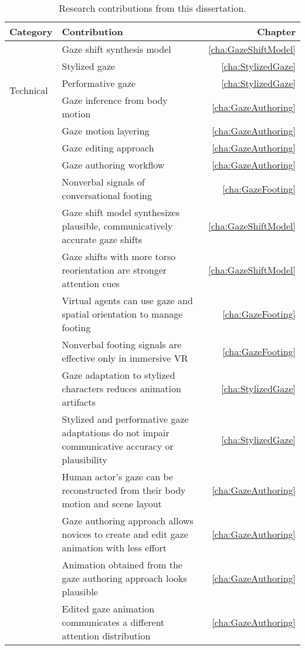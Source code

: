 \begin{table}
\small
\centering
\def\arraystretch{1.5}
\begin{tabularx}{\textwidth}{lp{10.8cm}r}
\hline
\textbf{Category} & \textbf{Contribution} & \textbf{Chapter} \\
\hline
\multirow{5}{*}{Technical} & Gaze shift synthesis model & \ref{cha:GazeShiftModel} \\
& Stylized gaze & \ref{cha:StylizedGaze} \\
& Performative gaze & \ref{cha:StylizedGaze} \\
& Gaze inference from body motion & \ref{cha:GazeAuthoring} \\
& Gaze motion layering & \ref{cha:GazeAuthoring} \\
\hdashline
\multirow{3}{*}{Design} & Gaze editing approach & \ref{cha:GazeAuthoring} \\
& Gaze authoring workflow & \ref{cha:GazeAuthoring} \\
& Nonverbal signals of conversational footing & \ref{cha:GazeFooting} \\
\hdashline
\multirow{10}{*}{Empirical} & Gaze shift model synthesizes plausible, communicatively accurate gaze shifts & \ref{cha:GazeShiftModel} \\
& Gaze shifts with more torso reorientation are stronger attention cues & \ref{cha:GazeShiftModel} \\
& Virtual agents can use gaze and spatial orientation to manage footing & \ref{cha:GazeFooting} \\
& Nonverbal footing signals are effective only in immersive VR & \ref{cha:GazeFooting} \\
& Gaze adaptation to stylized characters reduces animation artifacts & \ref{cha:StylizedGaze} \\
& Stylized and performative gaze adaptations do not impair communicative accuracy or plausibility & \ref{cha:StylizedGaze} \\
& Human actor's gaze can be reconstructed from their body motion and scene layout & \ref{cha:GazeAuthoring} \\
& Gaze authoring approach allows novices to create and edit gaze animation with less effort & \ref{cha:GazeAuthoring} \\
& Animation obtained from the gaze authoring approach looks plausible & \ref{cha:GazeAuthoring} \\
& Edited gaze animation communicates a different attention distribution & \ref{cha:GazeAuthoring} \\
\hline
\end{tabularx}
\caption{Research contributions from this dissertation.}
\label{tab:Contributions}
\end{table}

